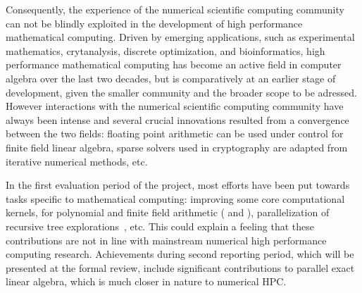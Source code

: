 Consequently, the experience of the numerical scientific computing community can not
be blindly exploited in the development of high performance mathematical
computing.
Driven by emerging applications, such as experimental mathematics, crytanalysis,
discrete optimization, and bioinformatics, high performance mathematical computing has
become an active field in computer algebra over the last two decades, but is
comparatively at an earlier stage of development, given the smaller community
and the broader scope to be adressed.
However interactions with the numerical scientific computing community
have always been intense and several crucial innovations
resulted from a convergence between the two fields: floating point arithmetic
can be used under control for finite field linear algebra, sparse solvers used
in cryptography are adapted from iterative numerical methods, etc.

In the first evaluation period of the project, most efforts have been put
towards tasks specific to mathematical computing: improving some core computational kernels, for polynomial and finite
field arithmetic (  and ),
parallelization of recursive tree explorations~, etc. This could explain a
feeling that these contributions are not in line with mainstream numerical high
performance computing research.
Achievements during second reporting period, which will be presented
at the formal review, include significant contributions to parallel
exact linear algebra, which is much closer in nature to numerical HPC.

